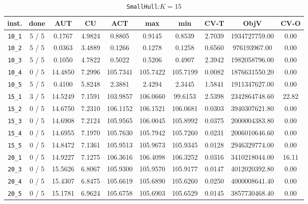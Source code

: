 
\begin{table}[h!]
\begin{center}
\small
\begin{tabular}{| c | c | c | c | c | c | c | c | c | c |}
\hline
inst. & done & AUT & CU & ACT & max & min & CV-T & ObjV & CV-O \\
\hline
\verb|10_1| & 5 / 5 & 0.1767 & 4.9824 & 0.8805 & 0.9145 & 0.8539 & 2.7039 & 1934727759.00 & 0.00\\ 
\verb|10_2| & 5 / 5 & 0.0363 & 3.4889 & 0.1266 & 0.1278 & 0.1258 & 0.6560 & 976193967.00 & 0.00\\ 
\verb|10_3| & 5 / 5 & 0.1050 & 4.7822 & 0.5022 & 0.5206 & 0.4907 & 2.3942 & 1982058796.00 & 0.00\\ 
\verb|10_4| & 0 / 5 & 14.4850 & 7.2996 & 105.7341 & 105.7422 & 105.7199 & 0.0082 & 1876631550.20 & 0.00\\ 
\verb|10_5| & 5 / 5 & 0.4100 & 5.8248 & 2.3881 & 2.4294 & 2.3445 & 1.5841 & 1911347627.00 & 0.00\\ 
\verb|15_1| & 3 / 5 & 14.5249 & 7.1591 & 103.9857 & 106.0660 & 99.6153 & 2.5398 & 2342864748.60 & 22.82\\ 
\verb|15_2| & 0 / 5 & 14.6750 & 7.2310 & 106.1152 & 106.1521 & 106.0681 & 0.0303 & 3940307621.80 & 0.00\\ 
\verb|15_3| & 0 / 5 & 14.6908 & 7.2124 & 105.9565 & 106.0045 & 105.8992 & 0.0375 & 2000004383.80 & 0.00\\ 
\verb|15_4| & 0 / 5 & 14.6955 & 7.1970 & 105.7630 & 105.7942 & 105.7260 & 0.0231 & 2006010646.60 & 0.00\\ 
\verb|15_5| & 0 / 5 & 14.8472 & 7.1361 & 105.9513 & 105.9673 & 105.9345 & 0.0128 & 2946329774.00 & 0.00\\ 
\verb|20_1| & 0 / 5 & 14.9227 & 7.1275 & 106.3616 & 106.4098 & 106.3252 & 0.0316 & 3410218044.00 & 16.11\\ 
\verb|20_3| & 0 / 5 & 15.5626 & 6.8067 & 105.9300 & 105.9570 & 105.9177 & 0.0147 & 4012020392.80 & 0.00\\ 
\verb|20_4| & 0 / 5 & 15.4307 & 6.8475 & 105.6619 & 105.6890 & 105.6260 & 0.0250 & 4000008641.40 & 0.00\\ 
\verb|20_5| & 0 / 5 & 15.1781 & 6.9624 & 105.6758 & 105.6903 & 105.6529 & 0.0145 & 3857730468.40 & 0.00\\ 
\hline
\end{tabular}
\caption{\texttt{SmallHull}:$K=15$}
\label{table:hull:15}
\end{center}
\end{table}